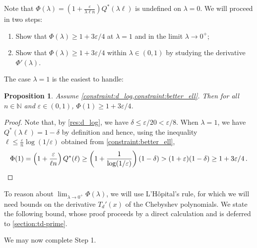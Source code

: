 \documentclass[10pt,a4paper]{article}
\makeatletter
\newtheorem{proposition}{Proposition}[section]
\newcommand\IfRestateTF{%
  \ifx\label\thmt@gobble@label %
    \expandafter\@firstoftwo
  \else
    \expandafter\@secondoftwo
  \fi
}
\newcommand{\RestateRemark}{\IfRestateTF{{\normalfont\bfseries (Restated) }}{}}
\newcommand{\bN}{\ensuremath{\mathbb{N}}}
\renewcommand{\epsilon}{\varepsilon}
\makeatother
\begin{document}
Note that $\Phi(\lambda) = \left(1 + \frac{\epsilon}{\lambda \ell n}\right) Q^*(\lambda \ell)$ is
undefined on $\lambda = 0$. We will proceed in two steps:
\begin{enumerate}
\item Show that $\Phi(\lambda) \ge 1+3\epsilon/4$ at $\lambda = 1$ and in the limit $\lambda \to
    0^+$;
\item Show that $\Phi(\lambda) \ge 1+3\epsilon/4$ within $\lambda \in (0,1)$ by studying the
    derivative $\Phi'(\lambda)$.
\end{enumerate}

The case $\lambda = 1$ is the easiest to handle:

\begin{proposition}
    \label{res:phi-at-1}
    Assume \cref{constraint:d_log,constraint:better_ell}. Then for all $n \in \bN$ and $\epsilon \in
    (0, 1)$, $\Phi(1) \ge 1 + 3\epsilon/4$.
\end{proposition}
\begin{proof}
    Note that, by \cref{res:d_log}, we have $\delta \le \epsilon/20 < \epsilon/8$. When $\lambda =
    1$, we have $Q^*(\lambda \ell) = 1-\delta$ by definition and hence, using the inequality $\ell
    \le \tfrac{\epsilon}{n} \log(1/\epsilon)$ obtained from \cref{constraint:better_ell},
    \[
        \Phi(1)
        = \left(1 + \frac{\epsilon}{\ell n}\right) Q^*(\ell)
        \ge \left(1 + \frac{1}{\log(1/\epsilon)}\right) (1-\delta)
        > (1 + \epsilon) (1-\delta)
        \ge 1 + 3\epsilon/4 \,. \qedhere
    \]
\end{proof}

To reason about $\lim_{\lambda \to 0^+} \Phi(\lambda)$, we will use L'Hôpital's rule, for which we
will need bounds on the derivative $T_d'(x)$ of the Chebyshev polynomials. We state the following
bound, whose proof proceeds by a direct calculation and is deferred to \cref{section:td-prime}.


We may now complete Step 1.
\end{document}
